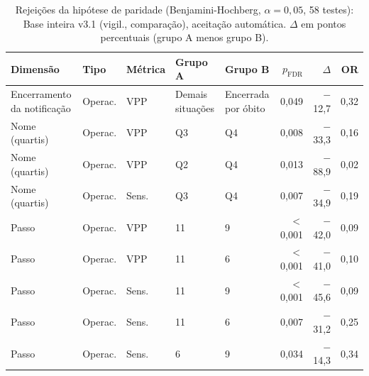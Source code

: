 \begin{table}[htbp]
\centering
\caption{Rejei\c{c}\~oes da hip\'otese de paridade (Benjamini-Hochberg, $\alpha = 0{,}05$, 58 testes): Base inteira v3.1 (vigil., comparação), aceitação automática. $\Delta$ em pontos percentuais (grupo A menos grupo B).}
\label{tab:equidade-arranjo-rejeicoes-cascata-v31-vigilancia}
\footnotesize\setlength{\tabcolsep}{3pt}
\begin{tabular}{lllllrrr}
\toprule
Dimens\~ao & Tipo & M\'etrica & Grupo A & Grupo B & $p_{\mathrm{FDR}}$ & $\Delta$ & OR \\
\midrule
Encerramento da notifica\c{c}\~ao & Operac. & VPP & Demais situa\c{c}\~oes & Encerrada por \'obito & 0{,}049 & $-$12{,}7 & 0{,}32 \\
Nome (quartis) & Operac. & VPP & Q3 & Q4 & 0{,}008 & $-$33{,}3 & 0{,}16 \\
Nome (quartis) & Operac. & VPP & Q2 & Q4 & 0{,}013 & $-$88{,}9 & 0{,}02 \\
Nome (quartis) & Operac. & Sens. & Q3 & Q4 & 0{,}007 & $-$34{,}9 & 0{,}19 \\
Passo & Operac. & VPP & 11 & 9 & $<$0{,}001 & $-$42{,}0 & 0{,}09 \\
Passo & Operac. & VPP & 11 & 6 & $<$0{,}001 & $-$41{,}0 & 0{,}10 \\
Passo & Operac. & Sens. & 11 & 9 & $<$0{,}001 & $-$45{,}6 & 0{,}09 \\
Passo & Operac. & Sens. & 11 & 6 & 0{,}007 & $-$31{,}2 & 0{,}25 \\
Passo & Operac. & Sens. & 6 & 9 & 0{,}034 & $-$14{,}3 & 0{,}34 \\
\bottomrule
\end{tabular}
\par{}\end{table}
